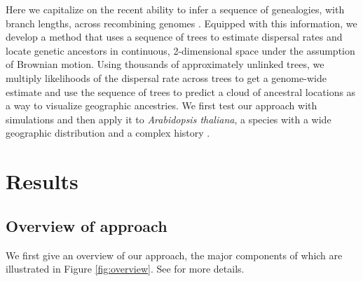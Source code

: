 \documentclass[12pt]{article}
\begin{document}
Here we capitalize on the recent ability to infer a sequence of genealogies, with branch lengths, across recombining genomes \citep{rasmussen2014genome,speidel2019method,wohns2021unified}.
Equipped with this information, we develop a method that uses a sequence of trees to estimate dispersal rates and locate genetic ancestors in continuous, 2-dimensional space under the assumption of Brownian motion.
Using thousands of approximately unlinked trees, we multiply likelihoods of the dispersal rate across trees to get a genome-wide estimate and use the sequence of trees to predict a cloud of ancestral locations as a way to visualize geographic ancestries.
We first test our approach with simulations and then apply it to \textit{Arabidopsis thaliana}, a species with a wide geographic distribution and a complex history \citep{fulgione2018archaic}.

\section*{Results}

\subsection*{Overview of approach} 

We first give an overview of our approach, the major components of which are illustrated in Figure \ref{fig:overview}.
See  for more details.

\end{document}

